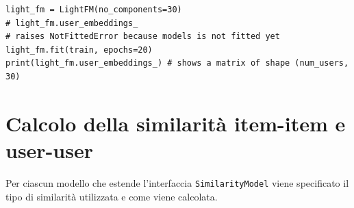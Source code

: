 \begin{itemize}
\begin{lstlisting}[caption=Esempio di utilizzo dei parametri appresi]
light_fm = LightFM(no_components=30)
# light_fm.user_embeddings_ 
# raises NotFittedError because models is not fitted yet
light_fm.fit(train, epochs=20)
print(light_fm.user_embeddings_) # shows a matrix of shape (num_users, 30)
\end{lstlisting}

\end{itemize}

\section{Calcolo della similarità item-item e user-user}

Per ciascun modello che estende l'interfaccia \texttt{SimilarityModel} viene specificato il tipo di similarità utilizzata e come viene calcolata.

